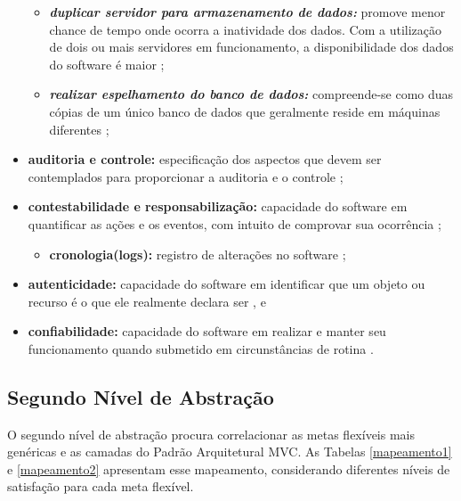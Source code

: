 \begin{itemize}
\begin{itemize}
	 		\item \textbf{\textit{duplicar servidor para armazenamento de dados:}} promove menor chance de tempo onde ocorra a inatividade dos dados. Com a utilização de dois ou mais servidores em funcionamento, a disponibilidade dos dados do software é maior \cite{date2004introduccao}\cite{affleck2012supporting};   
	 		
	 		\item \textbf{\textit{realizar espelhamento do banco de dados:}} compreende-se como duas cópias de um único banco de dados que geralmente reside em máquinas diferentes \cite{date2004introduccao}\cite{affleck2012supporting}; 
	 		
	 \end{itemize}
 
 	\item \textbf{auditoria e controle:} especificação dos aspectos que devem ser contemplados para proporcionar a auditoria e o controle \cite{benitti2015taxonomia}; 
 	
 	\item  \textbf{contestabilidade e responsabilização:} capacidade do software em quantificar as ações e os eventos, com intuito de comprovar sua ocorrência \cite{benitti2015taxonomia}; 
 	
 	\begin{itemize}
 		
 		\item \textbf{cronologia(logs):} registro de alterações no software \cite{benitti2015taxonomia};
 		
 	\end{itemize}
 	
 	\item \textbf{autenticidade:} capacidade do software em identificar que um objeto ou recurso é o que ele realmente declara ser \cite{benitti2015taxonomia}, e
 	
 	\item \textbf{confiabilidade:} capacidade do software em realizar e manter seu funcionamento quando submetido em circunstâncias de rotina \cite{benitti2015taxonomia}. 
 	
\end{itemize}

\subsection{Segundo Nível de Abstração}
\label{sub:segundoNivel}

O segundo nível de abstração procura correlacionar as metas flexíveis mais genéricas e as camadas do Padrão Arquitetural MVC. As Tabelas \ref{mapeamento1} e \ref{mapeamento2} apresentam esse mapeamento, considerando diferentes níveis de satisfação para cada meta flexível.


